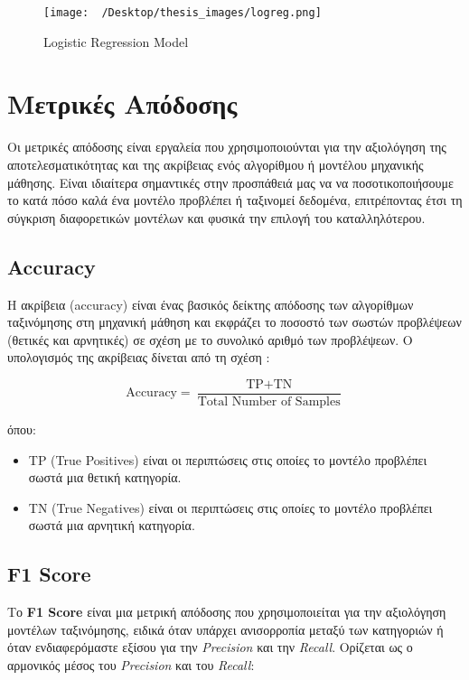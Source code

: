 \documentclass[diploma]{softlab-thesis}
\begin{document}
\begin{figure}[h]
    \centering
    \texttt{[image: ~/Desktop/thesis\_images/logreg.png]} %
    \caption{Logistic
     Regression Model}
    \label{fig:your_image_label}
\end{figure}


\section{Μετρικές Απόδοσης}
\label{sec:metrics}

Οι μετρικές απόδοσης είναι εργαλεία που χρησιμοποιούνται για την αξιολόγηση της αποτελεσματικότητας και της ακρίβειας ενός αλγορίθμου ή μοντέλου μηχανικής μάθησης. Είναι ιδιαίτερα σημαντικές στην προσπάθειά μας να να ποσοτικοποιήσουμε το κατά πόσο καλά ένα μοντέλο προβλέπει ή ταξινομεί δεδομένα, επιτρέποντας έτσι τη σύγκριση διαφορετικών μοντέλων και φυσικά την επιλογή του καταλληλότερου.

\subsection{Accuracy}

Η ακρίβεια (accuracy) είναι ένας βασικός δείκτης απόδοσης των αλγορίθμων ταξινόμησης στη μηχανική μάθηση και εκφράζει το ποσοστό των σωστών προβλέψεων (θετικές και αρνητικές) σε σχέση με το συνολικό αριθμό των προβλέψεων. Ο υπολογισμός της ακρίβειας δίνεται από τη σχέση : 

\[
\text{Accuracy} = \frac{\text{TP} + \text{TN}}{\text{Total Number of Samples}}
\]

όπου:

\begin{itemize}
\item TP (True Positives) είναι οι περιπτώσεις στις οποίες το μοντέλο προβλέπει σωστά μια θετική κατηγορία.
\item TN (True Negatives) είναι οι περιπτώσεις στις οποίες το μοντέλο προβλέπει σωστά μια αρνητική κατηγορία.
\end{itemize}


\subsection{F1 Score}

Το \textbf{F1 Score} είναι μια μετρική απόδοσης που χρησιμοποιείται για την αξιολόγηση μοντέλων ταξινόμησης, ειδικά όταν υπάρχει ανισορροπία μεταξύ των κατηγοριών ή όταν ενδιαφερόμαστε εξίσου για την \textit{Precision} και την \textit{Recall}. Ορίζεται ως ο αρμονικός μέσος του \textit{Precision} και του \textit{Recall}:
\end{document}
